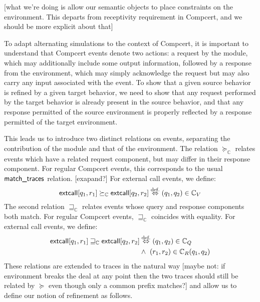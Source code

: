 [what we're doing
is allow our semantic objects
to place constraints on the environment.
This departs from receptivity requirement in Compcert,
and we should be more explicit about that]

To adapt alternating simulations to the context of Compcert,
it is important to understand that Compcert events
denote two actions:
a request by the module,
which may additionally include some output information,
followed by a response from the environment,
which may simply acknowledge the request
but may also carry any input associated with the event.
To show that
a given source behavior is refined by
a given target behavior,
we need to show that any request performed by the target behavior
is already present in the source behavior,
and that any response permitted of the source environment
is properly reflected by
a response permitted of the target environment.

This leads us to introduce two distinct relations on events,
separating the contribution of the module and that of the environment.
The relation $\succeq_\mathbb{C}$
relates events
which have a related request component,
but may differ in their response component.
For regular Compcert events,
this corresponds to the usual $ \textsf{match\_traces} $ relation.
[exapand?]
For external call events, we define:
\[
   \textsf{extcall} [q_1, r_1] \succeq_\mathbb{C}  \textsf{extcall} [q_2, r_2]
  \stackrel{\text{def.}}{\Leftrightarrow}
  (q_1, q_2) \in \mathbb{C}_V
\]
The second relation $\sqsupseteq_\mathbb{C}$
relates events whose query and response components
both match.
For regular Compcert events,
$\sqsupseteq_\mathbb{C}$ coincides with equality.
For external call events, we define:
\begin{align*}
  \kw{extcall}[q_1, r_1] \sqsupseteq_\mathbb{C} \kw{extcall}[q_2, r_2]
  &\stackrel{\text{def.}}{\Leftrightarrow}
  (q_1, q_2) \in \mathbb{C}_Q \\ &\wedge \ 
  (r_1, r_2) \in \mathbb{C}_R(q_1, q_2)
\end{align*}
These relations are extended to traces in the natural way
[maybe not: if environment breaks the deal at any point
then the two traces should still be related by $\succeq$
even though only a common prefix matches?]
and allow us to define
our notion of refinement as follows.


